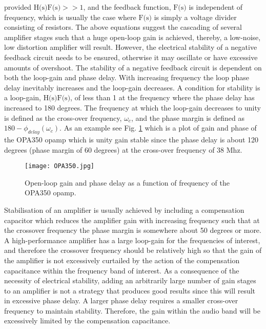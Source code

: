\documentclass[a4paper,10pt, oneside]{article}
\begin{document}
provided $\textrm{H(s)F(s)}>>1$, and the feedback function, $\textrm{F(s)}$ is 
independent of frequency, which is usually the case where $\textrm{F(s)}$ is
simply a voltage divider consisting of resistors. 
The above equations suggest the cascading of several amplifier stages such that a huge open-loop gain is achieved, 
thereby, a low-noise, low distortion amplifier will result. However, the electrical stability of a negative feedback circuit needs to be ensured, otherwise it may oscillate or have excessive amounts of overshoot. The stability of a negative feedback circuit is dependent on both the loop-gain and phase delay. With increasing frequency the loop 
phase delay inevitably increases and the loop-gain decreases. A condition for stability is a loop-gain, 
$\textrm{H(s)F(s)}$, of less than 1 at the frequency where the phase delay has increased to 180 degrees. The frequency 
at which the loop-gain decreases to unity is defined as the cross-over frequency, $\omega_{c}$, and the phase margin 
is defined as $180-\phi_{delay}(\omega_{c})$. As an example see Fig. \ref{OPA350} which is a plot of gain and phase of 
the OPA350 opamp which is unity gain stable since the phase delay is about 120 degrees (phase margin of 60 degrees) at the cross-over frequency of 38 Mhz. 

\begin{figure}[H]
\begin{centering}
	\texttt{[image: OPA350.jpg]}
	\caption{Open-loop gain and phase delay as a function of frequency of the OPA350 opamp.}\label{OPA350}
\end{centering}	
\end{figure}

Stabilisation of an amplifier is usually achieved by including a compensation capacitor which reduces the amplifier gain 
with increasing frequency such that at the crossover frequency the phase margin is somewhere about 50 degrees or more. 
A high-performance amplifier has a large loop-gain for the frequencies of interest, and therefore the crossover frequency 
should be relatively high so that the gain of the amplifier is not excessively curtailed by the action of the 
compensation capacitance within the frequency band of interest. As a consequence of the necessity of electrical 
stability, adding an arbitrarily large number of gain stages to an amplifier is not a strategy that produces good 
results since this will result in excessive phase delay. A larger phase delay requires a smaller cross-over frequency to maintain stability. Therefore, the gain within the audio band will be excessively limited by the compensation capacitance. 
\end{document}
